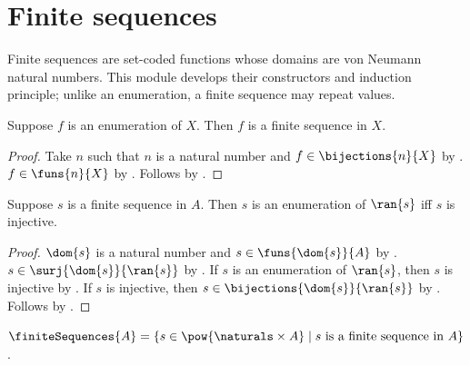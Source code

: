 \section{Finite sequences}




Finite sequences are set-coded functions whose domains are von Neumann
natural numbers.  This module develops their constructors and induction
principle; unlike an enumeration, a finite sequence may repeat values.

\begin{proposition}\label{enumeration_is_finite_sequence}
    Suppose $f$ is an enumeration of $X$.
    Then $f$ is a finite sequence in $X$.
\end{proposition}
\begin{proof}
    Take $n$ such that $n$ is a natural number and
        $f\in\bijections{n}{X}$ by .
    $f\in\funs{n}{X}$ by .
    Follows by .
\end{proof}

\begin{proposition}\label{finite_sequence_enumerates_range_iff_injective}
    Suppose $s$ is a finite sequence in $A$.
    Then $s$ is an enumeration of $\ran{s}$ iff $s$ is injective.
\end{proposition}
\begin{proof}
    $\dom{s}$ is a natural number and
        $s\in\funs{\dom{s}}{A}$ by .
    $s\in\surj{\dom{s}}{\ran{s}}$ by .
    If $s$ is an enumeration of $\ran{s}$, then $s$ is injective
        by .
    If $s$ is injective, then
        $s\in\bijections{\dom{s}}{\ran{s}}$
        by .
    Follows by .
\end{proof}

\begin{definition}\label{finite_sequences}
    $\finiteSequences{A}=
        \{s\in\pow{\naturals\times A}\mid
            \text{$s$ is a finite sequence in $A$}\}$.
\end{definition}

